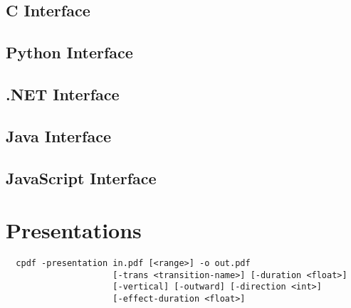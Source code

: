 \documentclass{book}
\begin{document}
\clearpage\pagestyle{empty}

\begin{cpdflib}
\clearpage
\section*{C Interface}
\begin{small}\tt

\end{small}
\end{cpdflib}

\begin{pycpdflib}
\clearpage
\section*{Python Interface}
\begin{small}\tt

\end{small}
\end{pycpdflib}

\begin{dotnetcpdflib}
\clearpage
\section*{.NET Interface}
\begin{small}\tt

\end{small}
\end{dotnetcpdflib}

\begin{jcpdflib}
\clearpage
\section*{Java Interface}
\begin{small}\tt

\end{small}
\end{jcpdflib}

\begin{jscpdflib}
\clearpage
\section*{JavaScript Interface}
\begin{small}\tt

\end{small}
\end{jscpdflib}

\chapter{Presentations}\label{chap:7}\pagestyle{fancy}
  \begin{framed}
  \small\noindent\begin{verbatim}
  cpdf -presentation in.pdf [<range>] -o out.pdf
                     [-trans <transition-name>] [-duration <float>]
                     [-vertical] [-outward] [-direction <int>]
                     [-effect-duration <float>]\end{verbatim}
\end{framed}
\end{document}
